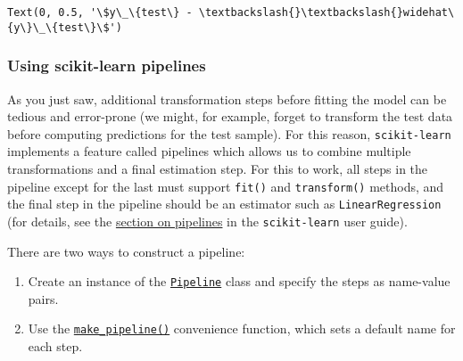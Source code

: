 \documentclass{scrartcl}
\makeatletter
\providecommand{\tightlist}{%
      \setlength{\itemsep}{0pt}\setlength{\parskip}{0pt}}
\newcommand{\boxspacing}{\kern\kvtcb@left@rule\kern\kvtcb@boxsep}
\newcommand{\prompt}[4]{
        {\ttfamily\llap{{\color{#2}[#3]:\hspace{3pt}#4}}\vspace{-\baselineskip}}
    }
\makeatother
\begin{document}
            \begin{tcolorbox}[breakable, size=fbox, boxrule=.5pt, pad at break*=1mm, opacityfill=0]
\prompt{Out}{outcolor}{22}{\boxspacing}
\begin{Verbatim}[commandchars=\\\{\}]
Text(0, 0.5, '\$y\_\{test\} - \textbackslash{}\textbackslash{}widehat\{y\}\_\{test\}\$')
\end{Verbatim}
\end{tcolorbox}
        
    \begin{center}
    \end{center}
    
    \hypertarget{using-scikit-learn-pipelines}{%
\subsubsection{Using scikit-learn
pipelines}\label{using-scikit-learn-pipelines}}

As you just saw, additional transformation steps before fitting the
model can be tedious and error-prone (we might, for example, forget to
transform the test data before computing predictions for the test
sample). For this reason, \texttt{scikit-learn} implements a feature
called pipelines which allows us to combine multiple transformations and
a final estimation step. For this to work, all steps in the pipeline
except for the last must support \texttt{fit()} and \texttt{transform()}
methods, and the final step in the pipeline should be an estimator such
as \texttt{LinearRegression} (for details, see the
\href{https://scikit-learn.org/stable/modules/compose.html\#pipeline}{section
on pipelines} in the \texttt{scikit-learn} user guide).

There are two ways to construct a pipeline:

\begin{enumerate}
\def\labelenumi{\arabic{enumi}.}
\tightlist
\item
  Create an instance of the
  \href{https://scikit-learn.org/stable/modules/generated/sklearn.pipeline.Pipeline.html\#sklearn.pipeline.Pipeline}{\texttt{Pipeline}}
  class and specify the steps as name-value pairs.
\item
  Use the
  \href{https://scikit-learn.org/stable/modules/generated/sklearn.pipeline.make_pipeline.html}{\texttt{make\_pipeline()}}
  convenience function, which sets a default name for each step.
\end{enumerate}
\end{document}
